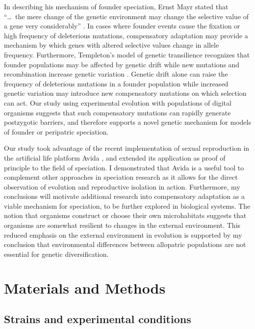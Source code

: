 \begin{doublespace}
In describing his mechanism of founder speciation, Ernst Mayr stated that
``\dots\ the mere change of the genetic environment may change the
selective value of a gene very considerably'' \citep{tem08}.
%
In cases where founder events cause the fixation or high frequency
of deleterious mutations, compensatory adaptation may provide a
mechanism by which genes with altered selective values change
in allele frequency.
%
Furthermore, Templeton's model of genetic transilience recognizes
that founder populations may be affected by genetic drift
while new mutations and recombination increase genetic variation \citep{tem08}.
%
Genetic drift alone can raise the frequency of deleterious mutations
in a founder population while increased genetic variation
may introduce new compensatory mutations on which selection can act.
%
Our study using experimental evolution with populations of digital organisms
suggests that such compensatory mutations can rapidly generate
postzygotic barriers, and therefore supports a novel genetic mechanism
for models of founder or peripatric speciation.


Our study took advantage
of the recent implementation of sexual reproduction
in the artificial life platform Avida \citep{mis06},
and extended its application
as proof of principle to the field of speciation.
%
I demonstrated that Avida is a useful tool to complement
other approaches in speciation research as it allows for
the direct observation of evolution and reproductive isolation in action.
%
Furthermore, my conclusions will motivate additional research
into compensatory adaptation as a viable mechanism for speciation,
to be further explored in biological systems.
%
The notion that organisms construct or choose
their own microhabitats \citep{lew00}
suggests that organisms are somewhat
resilient to changes in the external environment.
%
This reduced emphasis on the external environment in evolution
is supported by my conclusion that environmental differences
between allopatric populations are not essential for genetic diversification.



\section{Materials and Methods}

\subsection{Strains and experimental conditions}


\end{doublespace}
